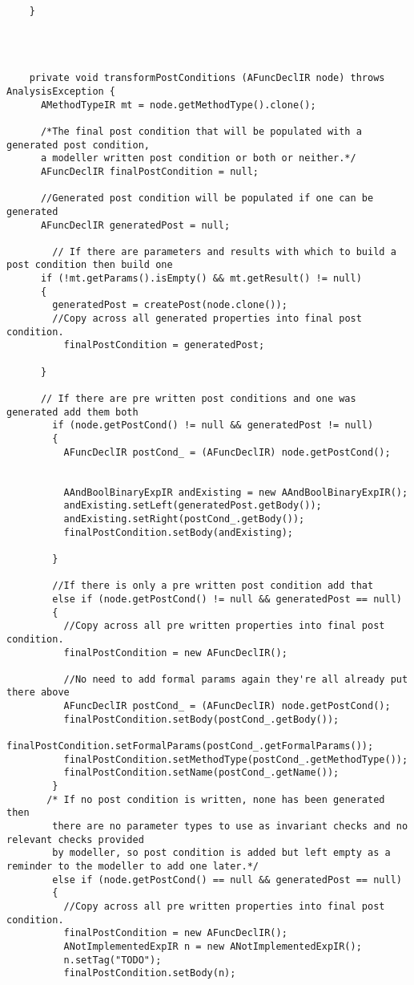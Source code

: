 \begin{appendices}
\begin{lstlisting}
    }
    
    

    
    private void transformPostConditions (AFuncDeclIR node) throws AnalysisException {
      AMethodTypeIR mt = node.getMethodType().clone();
      
      /*The final post condition that will be populated with a generated post condition,
      a modeller written post condition or both or neither.*/
      AFuncDeclIR finalPostCondition = null;
      
      //Generated post condition will be populated if one can be generated
      AFuncDeclIR generatedPost = null;
      
        // If there are parameters and results with which to build a post condition then build one
      if (!mt.getParams().isEmpty() && mt.getResult() != null)
      {
        generatedPost = createPost(node.clone()); 
        //Copy across all generated properties into final post condition.
          finalPostCondition = generatedPost;
          
      }
      
      // If there are pre written post conditions and one was generated add them both
        if (node.getPostCond() != null && generatedPost != null)
        {
          AFuncDeclIR postCond_ = (AFuncDeclIR) node.getPostCond();   
          
          
          AAndBoolBinaryExpIR andExisting = new AAndBoolBinaryExpIR();
          andExisting.setLeft(generatedPost.getBody());
          andExisting.setRight(postCond_.getBody());
          finalPostCondition.setBody(andExisting);
          
        }
        
        //If there is only a pre written post condition add that
        else if (node.getPostCond() != null && generatedPost == null)
        {
          //Copy across all pre written properties into final post condition.
          finalPostCondition = new AFuncDeclIR();
          
          //No need to add formal params again they're all already put there above
          AFuncDeclIR postCond_ = (AFuncDeclIR) node.getPostCond();
          finalPostCondition.setBody(postCond_.getBody());
          finalPostCondition.setFormalParams(postCond_.getFormalParams());
          finalPostCondition.setMethodType(postCond_.getMethodType());
          finalPostCondition.setName(postCond_.getName());
        }
       /* If no post condition is written, none has been generated then
        there are no parameter types to use as invariant checks and no relevant checks provided
        by modeller, so post condition is added but left empty as a reminder to the modeller to add one later.*/
        else if (node.getPostCond() == null && generatedPost == null)
        {
          //Copy across all pre written properties into final post condition.
          finalPostCondition = new AFuncDeclIR();
          ANotImplementedExpIR n = new ANotImplementedExpIR();
          n.setTag("TODO");
          finalPostCondition.setBody(n);
       

\end{lstlisting}
\end{appendices}
